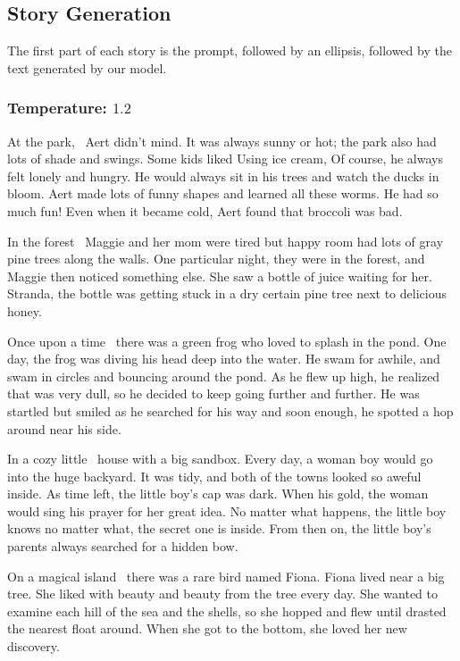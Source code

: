 \documentclass[11pt]{article}
\begin{document}
    \subsection{Story Generation}
    \label{story_gen}
    The first part of each story is the prompt, followed by an ellipsis, followed by the text generated by our model.

    \subsubsection*{Temperature: $1.2$}

    At the park, \textellipsis\ Aert didn't mind. It was always sunny or hot; the park also had lots of shade and swings. Some kids liked Using ice cream, Of course, he always felt lonely and hungry. He would always sit in his trees and watch the ducks in bloom. Aert made lots of funny shapes and learned all these worms. He had so much fun! Even when it became cold, Aert found that broccoli was bad.

    In the forest \textellipsis\ Maggie and her mom were tired but happy room had lots of gray pine trees along the walls. One particular night, they were in the forest, and Maggie then noticed something else. She saw a bottle of juice waiting for her.  Stranda, the bottle was getting stuck in a dry certain pine tree next to delicious honey.

    Once upon a time \textellipsis\ there was a green frog who loved to splash in the pond. One day, the frog was diving his head deep into the water. He swam for awhile, and swam in circles and bouncing around the pond.  As he flew up high, he realized that was very dull, so he decided to keep going further and further. He was startled but smiled as he searched for his way and soon enough, he spotted a hop around near his side.

    In a cozy little \textellipsis\ house with a big sandbox. Every day, a woman boy would go into the huge backyard. It was tidy, and both of the towns looked so aweful inside. As time left, the little boy's cap was dark. When his gold, the woman would sing his prayer for her great idea. No matter what happens, the little boy knows no matter what, the secret one is inside. From then on, the little boy's parents always searched for a hidden bow.

    On a magical island \textellipsis\ there was a rare bird named Fiona. Fiona lived near a big tree. She liked with beauty and beauty from the tree every day. She wanted to examine each hill of the sea and the shells, so she hopped and flew until drasted the nearest float around. When she got to the bottom, she loved her new discovery.
\end{document}
